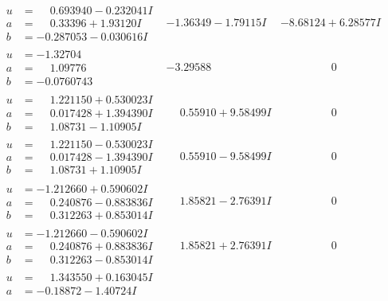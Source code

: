 \documentclass[1p]{elsarticle_modified}
\theoremstyle{definition}
\begin{document}
$$\begin{array}{c|c|c}
\begin{aligned}
u &= \phantom{-}0.693940 - 0.232041 I \\
a &= \phantom{-}0.33396 + 1.93120 I \\
b &= -0.287053 - 0.030616 I\end{aligned}
 & -1.36349 - 1.79115 I & -8.68124 + 6.28577 I \\ \hline\begin{aligned}
u &= -1.32704\phantom{ +0.000000I} \\
a &= \phantom{-}1.09776\phantom{ +0.000000I} \\
b &= -0.0760743\phantom{ +0.000000I}\end{aligned}
 & -3.29588\phantom{ +0.000000I} & \phantom{-0.000000 } 0 \\ \hline\begin{aligned}
u &= \phantom{-}1.221150 + 0.530023 I \\
a &= \phantom{-}0.017428 + 1.394390 I \\
b &= \phantom{-}1.08731 - 1.10905 I\end{aligned}
 & \phantom{-}0.55910 + 9.58499 I & \phantom{-0.000000 } 0 \\ \hline\begin{aligned}
u &= \phantom{-}1.221150 - 0.530023 I \\
a &= \phantom{-}0.017428 - 1.394390 I \\
b &= \phantom{-}1.08731 + 1.10905 I\end{aligned}
 & \phantom{-}0.55910 - 9.58499 I & \phantom{-0.000000 } 0 \\ \hline\begin{aligned}
u &= -1.212660 + 0.590602 I \\
a &= \phantom{-}0.240876 - 0.883836 I \\
b &= \phantom{-}0.312263 + 0.853014 I\end{aligned}
 & \phantom{-}1.85821 - 2.76391 I & \phantom{-0.000000 } 0 \\ \hline\begin{aligned}
u &= -1.212660 - 0.590602 I \\
a &= \phantom{-}0.240876 + 0.883836 I \\
b &= \phantom{-}0.312263 - 0.853014 I\end{aligned}
 & \phantom{-}1.85821 + 2.76391 I & \phantom{-0.000000 } 0 \\ \hline\begin{aligned}
u &= \phantom{-}1.343550 + 0.163045 I \\
a &= -0.18872 - 1.40724 I \\

\end{aligned}
\end{array}$$
\end{document}
